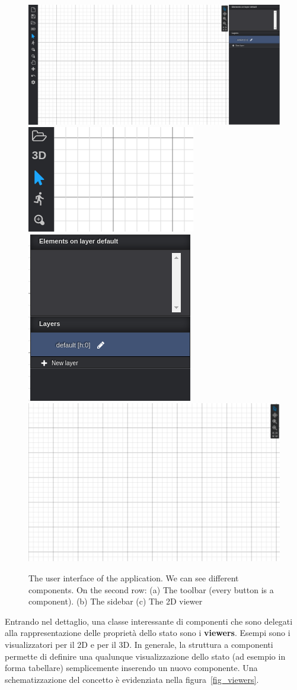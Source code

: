 \begin{figure}[h]
\centering
\includegraphics[width=0.65\linewidth]{contents/images/ui}\\
\vfill
\includegraphics[width=0.25\linewidth]{contents/images/toolbar}
\includegraphics[width=0.25\linewidth]{contents/images/sidebar}
\includegraphics[width=0.45\linewidth]{contents/images/viewer}
\caption{The user interface of the application. We can see different components. On the second row: (a) The toolbar (every button is a component). (b) The sidebar (c) The 2D viewer}
\label{fig_ui}
\end{figure}

Entrando nel dettaglio, una classe interessante di componenti che sono delegati alla rappresentazione delle propriet\`a dello stato sono i \textbf{viewers}. Esempi sono i visualizzatori per il 2D e per il 3D. In generale, la struttura a componenti permette di definire una qualunque visualizzazione dello stato (ad esempio in forma tabellare) semplicemente inserendo un nuovo componente. Una schematizzazione del concetto \`e evidenziata nella figura~\ref{fig_viewers}.\\

